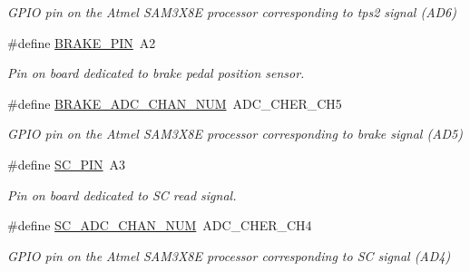 \begin{DoxyCompactItemize}
\begin{DoxyCompactList}\small\item\em G\+P\+IO pin on the Atmel S\+A\+M3\+X8E processor corresponding to tps2 signal (A\+D6) \end{DoxyCompactList}\item 
\mbox{\label{group___board__model__group_gad632b56bf4c6259a390c3db91607078e}} 
\#define \mbox{\hyperlink{group___board__model__group_gad632b56bf4c6259a390c3db91607078e}{B\+R\+A\+K\+E\+\_\+\+P\+IN}}~A2
\begin{DoxyCompactList}\small\item\em Pin on board dedicated to brake pedal position sensor. \end{DoxyCompactList}\item 
\mbox{\label{group___board__model__group_ga310547321c4a016c4ad19922920fadfd}} 
\#define \mbox{\hyperlink{group___board__model__group_ga310547321c4a016c4ad19922920fadfd}{B\+R\+A\+K\+E\+\_\+\+A\+D\+C\+\_\+\+C\+H\+A\+N\+\_\+\+N\+UM}}~A\+D\+C\+\_\+\+C\+H\+E\+R\+\_\+\+C\+H5
\begin{DoxyCompactList}\small\item\em G\+P\+IO pin on the Atmel S\+A\+M3\+X8E processor corresponding to brake signal (A\+D5) \end{DoxyCompactList}\item 
\mbox{\label{group___board__model__group_gabbdb157ae4ad39d102935c21fa30d1c5}} 
\#define \mbox{\hyperlink{group___board__model__group_gabbdb157ae4ad39d102935c21fa30d1c5}{S\+C\+\_\+\+P\+IN}}~A3
\begin{DoxyCompactList}\small\item\em Pin on board dedicated to SC read signal. \end{DoxyCompactList}\item 
\mbox{\label{group___board__model__group_ga564adb575db2620ac85e3abdd6a5bbaf}} 
\#define \mbox{\hyperlink{group___board__model__group_ga564adb575db2620ac85e3abdd6a5bbaf}{S\+C\+\_\+\+A\+D\+C\+\_\+\+C\+H\+A\+N\+\_\+\+N\+UM}}~A\+D\+C\+\_\+\+C\+H\+E\+R\+\_\+\+C\+H4
\begin{DoxyCompactList}\small\item\em G\+P\+IO pin on the Atmel S\+A\+M3\+X8E processor corresponding to SC signal (A\+D4) \end{DoxyCompactList}\item 

\end{DoxyCompactItemize}
